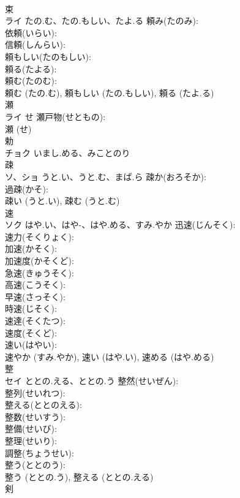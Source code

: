 \documentclass[8pt]{extreport}
\begin{document}
\begin{CJK}{UTF8}{min}
\\	束 
\\	ライ	たの.む、たの.もしい、たよ.る	頼み(たのみ): 
\\	依頼(いらい): 
\\	信頼(しんらい): 
\\	頼もしい(たのもしい): 
\\	頼る(たよる): 
\\	頼む(たのむ): 
\\	頼む (たの.む), 頼もしい (たの.もしい), 頼る (たよ.る)
\\	瀬			
\\	ライ	せ	瀬戸物(せともの): 
\\	瀬 (せ)
\\	勅			
\\	チョク	いまし.める、みことのり		
\\	疎			
\\	ソ、ショ	うと.い、うと.む、まば.ら	疎か(おろそか): 
\\	過疎(かそ): 
\\	疎い (うと.い), 疎む (うと.む)
\\	速			
\\	ソク	はや.い、はや-、はや.める、すみ.やか	迅速(じんそく): 
\\	速力(そくりょく): 
\\	加速(かそく): 
\\	加速度(かそくど): 
\\	急速(きゅうそく): 
\\	高速(こうそく): 
\\	早速(さっそく): 
\\	時速(じそく): 
\\	速達(そくたつ): 
\\	速度(そくど): 
\\	速い(はやい): 
\\	速やか (すみ.やか), 速い (はや.い), 速める (はや.める)
\\	整			
\\	セイ	ととの.える、ととの.う	整然(せいぜん): 
\\	整列(せいれつ): 
\\	整える(ととのえる): 
\\	整数(せいすう): 
\\	整備(せいび): 
\\	整理(せいり): 
\\	調整(ちょうせい): 
\\	整う(ととのう): 
\\	整う (ととの.う), 整える (ととの.える)
\\	剣			

\end{CJK}
\end{document}
